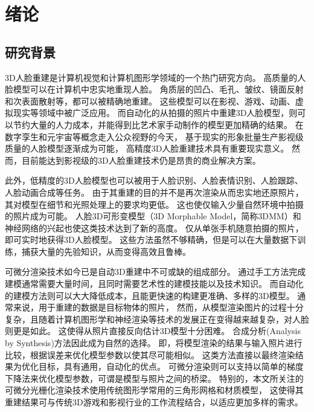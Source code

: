 \chapter{绪论}
\label{chap:intro}

\section{研究背景}

3D人脸重建是计算机视觉和计算机图形学领域的一个热门研究方向。
高质量的人脸模型可以在计算机中忠实地重现人脸。
角质层的凹凸、毛孔、皱纹、镜面反射和次表面散射等，都可以被精确地重建。
这些模型可以在影视、游戏、动画、虚拟现实等领域中被广泛应用。
而自动化的从拍摄的照片中重建3D人脸模型，则可以节约大量的人力成本，并能得到比艺术家手动制作的模型更加精确的结果。
在数字孪生和元宇宙等概念走入公众视野的今天，
基于现实的形象批量生产影视级质量的人脸模型逐渐成为可能，
高精度3D人脸重建技术具有重要现实意义。
然而，目前能达到影视级的3D人脸重建技术仍是昂贵的商业解决方案。

此外，低精度的3D人脸模型也可以被用于人脸识别\citep{BlanzV03}、人脸表情识别、人脸跟踪、人脸动画合成等任务。
由于其重建的目的并不是再次渲染从而忠实地还原照片，其对模型在细节和光照处理上的要求均更低。
这也使仅输入少量自然环境中拍摄的照片成为可能。
人脸3D可形变模型（3D Morphable Model，简称3DMM）和神经网络的兴起也使这类技术达到了新的高度。
仅从单张手机随意拍摄的照片，即可实时地获得3D人脸模型。
这些方法虽然不够精确，但是可以在大量数据下训练，捕获大量的先验知识，从而变得高效且鲁棒。

可微分渲染技术如今已是自动3D重建中不可或缺的组成部分。
通过手工方法完成建模通常需要大量时间，且同时需要艺术性的建模技能以及技术知识。
而自动化的建模方法则可以大大降低成本，且能更快速的构建更准确、多样的3D模型。
通常来说，用于重建的数据是目标物体的照片，
然而，从模型渲染图片的过程十分复杂，且随着计算机图形学和神经渲染等技术的发展正在变得越来越复杂，对人脸则更是如此。
这使得从照片直接反向估计3D模型十分困难。
合成分析(Analysis by Synthesis)方法因此成为自然的选择。
即，将模型渲染的结果与输入照片进行比较，根据误差来优化模型参数以使其尽可能相似。
这类方法直接以最终渲染结果为优化目标，具有通用，自动化的优点。
可微分渲染则可以支持以简单的梯度下降法来优化模型参数，可谓是模型与照片之间的桥梁。
特别的，本文所关注的可微分光栅化渲染技术使用传统图形学常用的三角形网格和材质模型，
这使得其重建结果可与传统3D游戏和影视行业的工作流程结合，以适应更加多样的需求。

